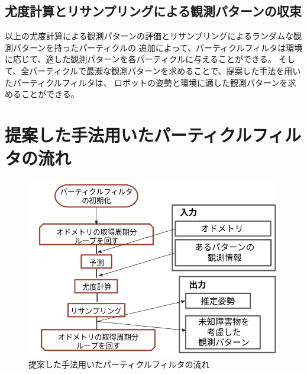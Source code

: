 \subsection{尤度計算とリサンプリングによる観測パターンの収束}

以上の尤度計算による観測パターンの評価とリサンプリングによるランダムな観測パターンを持ったパーティクルの
追加によって、パーティクルフィルタは環境に応じて、適した観測パターンを各パーティクルに与えることができる。
そして、全パーティクルで最瀕な観測パターンを求めることで、提案した手法を用いたパーティクルフィルタは、
ロボットの姿勢と環境に適した観測パターンを求めることができる。

\newpage
\section{提案した手法用いたパーティクルフィルタの流れ}

\begin{figure}[h]
  \begin{center}
    \includegraphics[width=1.0\linewidth]{figs/particle_filter_flow_improve.png}
    \caption{提案した手法用いたパーティクルフィルタの流れ}
    \label{fig:particle_filter_flow_improve}
  \end{center}
\end{figure}
